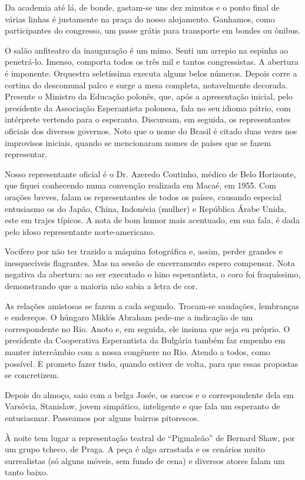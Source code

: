 Da academia até lá, de bonde, gastam-se uns dez minutos e o ponto final de várias linhas é justamente na praça do nosso alojamento. Ganhamos, como participantes do congresso, um passe grátis para transporte em bondes ou ônibus.

O salão anfiteatro da inauguração é um mimo. Senti um arrepio na espinha ao penetrá-lo. Imenso, comporta todos os três mil e tantos congressistas. A abertura é imponente. Orquestra seletíssima executa alguns belos números. Depois corre a cortina do descomunal palco e surge a mesa completa, notavelmente decorada. Presente o Ministro da Educação polonês, que, após a apresentação inicial, pelo presidente da Associação Esperantista polonesa, fala no seu idioma pátrio, com intérprete vertendo para o esperanto. Discursam, em seguida, os representantes oficiais dos diversos governos. Noto que o nome do Brasil é citado duas vezes nos improvisos iniciais, quando se mencionaram nomes de países que se fazem representar.

Nosso representante oficial é o Dr. Azeredo Coutinho, médico de Belo Horizonte, que fiquei conhecendo numa convenção realizada em Macaé, em 1955. Com orações breves, falam os representantes de todos os países, causando especial entusiasmo os do Japão, China, Indonésia (mulher) e República Árabe Unida, este em trajes típicos. A nota de bom humor mais acentuado, em sua fala, é dada pelo idoso representante norte-americano.

Vocifero por não ter trazido a máquina fotográfica e, assim, perder grandes e inesquecíveis flagrantes. Mas na sessão de encerramento espero compensar. Nota negativa da abertura: ao ser executado o hino esperantista, o coro foi fraquíssimo, demonstrando que a maioria não sabia a letra de cor.

As relações amistosas se fazem a cada segundo. Trocam-se saudações, lembranças e endereços. O húngaro Miklós Abraham pede-me a indicação de um correspondente no Rio. Anoto e, em seguida, ele insinua que seja eu próprio. O presidente da Cooperativa Esperantista da Bulgária também faz empenho em manter intercâmbio com a nossa congênere no Rio. Atendo a todos, como possível. E prometo fazer tudo, quando estiver de volta, para que essas propostas se concretizem.

Depois do almoço, saio com a belga Josée, os suecos e o correspondente dela em Varsóvia, Stanislaw, jovem simpático, inteligente e que fala um esperanto de entusiasmar. Passeamos por alguns bairros pitorescos.

À noite tem lugar a representação teatral de ``Pigmaleão'' de Bernard Shaw, por um grupo tcheco, de Praga. A peça é algo arrastada e os cenários muito surrealistas (só alguns móveis, sem fundo de cena) e diversos atores falam um tanto baixo.

